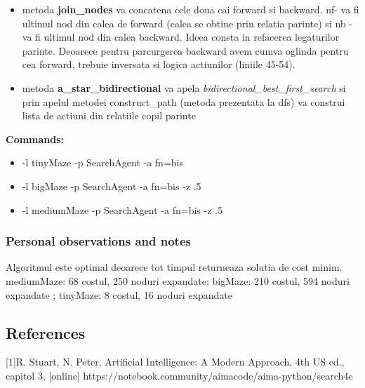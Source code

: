 \begin{itemize}
\begin{itemize}
        \end{itemize}
    \item metoda \textbf{join\_nodes} va concatena cele doua cai forward si backward. nf- va fi ultimul nod din calea de forward (calea se obtine prin relatia parinte) si nb - va fi ultimul nod din calea backward. Ideea consta in refacerea legaturilor parinte. Deoarece pentru parcurgerea backward avem cumva oglinda pentru cea forward, trebuie inversata si logica actiunilor (liniile 45-54).
    \item metoda \textbf{a\_star\_bidirectional} va apela \textit{bidirectional\_best\_first\_search} si prin apelul metodei construct\_path (metoda prezentata la dfs) va construi lista de actiuni din relatiile copil parinte 

\end{itemize}


\textbf{Commands:}
\begin{itemize}
    \setlength\itemsep{0em}
    \item  -l tinyMaze -p SearchAgent -a fn=bis
    \item  -l bigMaze -p SearchAgent -a fn=bis -z .5
    \item -l mediumMaze -p SearchAgent -a fn=bis -z .5
        
\end{itemize}
\subsubsection{Personal observations and notes}
Algoritmul este optimal deoarece tot timpul returneaza solutia de cost minim. mediumMaze: 68 costul, 250 noduri expandate; bigMaze: 210 costul, 594 noduri expandate ; tinyMaze: 8 costul, 16 noduri expandate

\vspace{0.75cm}

\vspace{0.75cm}

\subsection{References}
[1]R. Stuart, N. Peter, Artificial Intelligence: A Modern Approach, 4th US ed., capitol 3, [online] \newline
[2] https://notebook.community/aimacode/aima-python/search4e